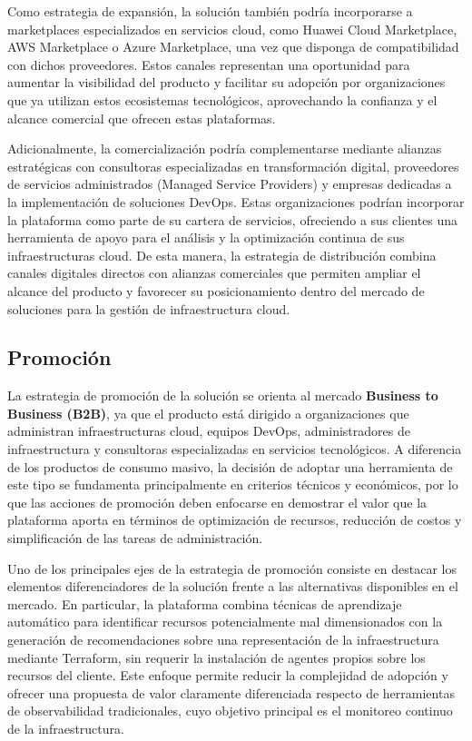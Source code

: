 Como estrategia de expansión, la solución también podría incorporarse a marketplaces especializados en servicios cloud, como Huawei Cloud Marketplace, AWS Marketplace o Azure Marketplace, una vez que disponga de compatibilidad con dichos proveedores. Estos canales representan una oportunidad para aumentar la visibilidad del producto y facilitar su adopción por organizaciones que ya utilizan estos ecosistemas tecnológicos, aprovechando la confianza y el alcance comercial que ofrecen estas plataformas.

Adicionalmente, la comercialización podría complementarse mediante alianzas estratégicas con consultoras especializadas en transformación digital, proveedores de servicios administrados (Managed Service Providers) y empresas dedicadas a la implementación de soluciones DevOps. Estas organizaciones podrían incorporar la plataforma como parte de su cartera de servicios, ofreciendo a sus clientes una herramienta de apoyo para el análisis y la optimización continua de sus infraestructuras cloud. De esta manera, la estrategia de distribución combina canales digitales directos con alianzas comerciales que permiten ampliar el alcance del producto y favorecer su posicionamiento dentro del mercado de soluciones para la gestión de infraestructura cloud.

\subsection{Promoción}

La estrategia de promoción de la solución se orienta al mercado \textbf{Business to Business (B2B)}, ya que el producto está dirigido a organizaciones que administran infraestructuras cloud, equipos DevOps, administradores de infraestructura y consultoras especializadas en servicios tecnológicos. A diferencia de los productos de consumo masivo, la decisión de adoptar una herramienta de este tipo se fundamenta principalmente en criterios técnicos y económicos, por lo que las acciones de promoción deben enfocarse en demostrar el valor que la plataforma aporta en términos de optimización de recursos, reducción de costos y simplificación de las tareas de administración.

Uno de los principales ejes de la estrategia de promoción consiste en destacar los elementos diferenciadores de la solución frente a las alternativas disponibles en el mercado. En particular, la plataforma combina técnicas de aprendizaje automático para identificar recursos potencialmente mal dimensionados con la generación de recomendaciones sobre una representación de la infraestructura mediante Terraform, sin requerir la instalación de agentes propios sobre los recursos del cliente. Este enfoque permite reducir la complejidad de adopción y ofrecer una propuesta de valor claramente diferenciada respecto de herramientas de observabilidad tradicionales, cuyo objetivo principal es el monitoreo continuo de la infraestructura.

